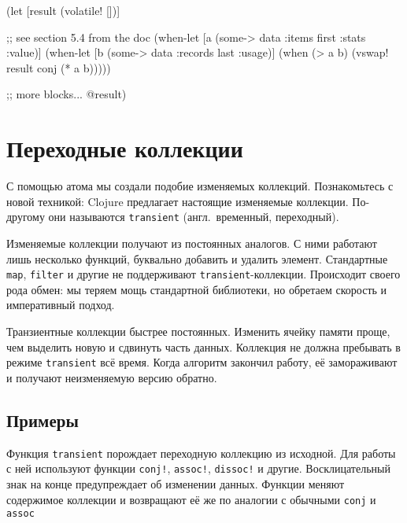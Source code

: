 \else

\begin{english}
  \begin{clojure}
(let [result (volatile! [])]

  ;; see section 5.4 from the doc
  (when-let [a (some-> data :items first :stats :value)]
    (when-let [b (some-> data :records last :usage)]
      (when (> a b)
        (vswap! result conj (* a b)))))

  ;; more blocks...
  @result)
  \end{clojure}
\end{english}

\fi

\section{Переходные коллекции}


С помощью атома мы создали подобие изменяемых коллекций. Познакомьтесь с новой
техникой: Clojure предлагает настоящие изменяемые коллекции. По-другому
они называются \verb|transient| (англ.~временный, переходный).

Изменяемые коллекции получают из постоянных аналогов. С ними работают лишь
несколько функций, буквально добавить и удалить элемент. Стандартные \verb|map|,
\verb|filter| и другие не поддерживают \verb|transient|-коллекции. Происходит
своего рода обмен: мы теряем мощь стандартной библиотеки, но обретаем скорость и
императивный подход.

Транзиентные коллекции быстрее постоянных. Изменить ячейку памяти проще, чем
выделить новую и сдвинуть часть данных. Коллекция не должна пребывать в режиме
\verb|transient| всё время. Когда алгоритм закончил работу, её
замораживают и получают неизменяемую версию обратно.

\subsection{Примеры}

Функция \verb|transient| порождает переходную коллекцию из исходной. Для работы
с ней используют функции \verb|conj!|, \verb|assoc!|, \verb|dissoc!| и
другие. Восклицательный знак на конце предупреждает об изменении данных. Функции
меняют содержимое коллекции и возвращают её же по аналогии с обычными
\verb|conj| и \verb|assoc|



